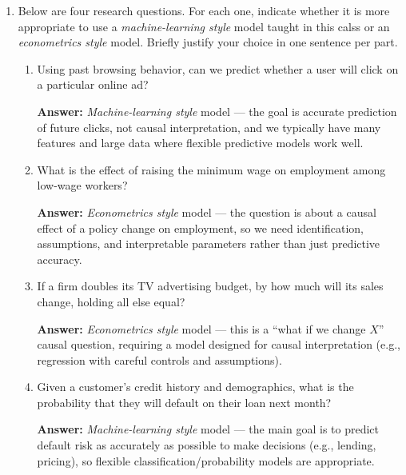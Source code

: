 \documentclass[11pt]{article}
\begin{document}
\begin{enumerate}[leftmargin=*]
\begin{enumerate}
  \textbf{Answer:} Lowering the threshold predicts class 1 for more observations, so we catch almost all the actual positives (higher recall) but also label more negatives as positives (more false positives, so lower precision). This tradeoff—higher recall at the cost of precision—is typical when we make the threshold more lenient.
\end{enumerate} 

\clearpage

\item Below are four research questions. For each one, indicate whether it is more appropriate to use a \emph{machine-learning style} model taught in this calss or an \emph{econometrics style} model. Briefly justify your choice in one sentence per part.

\begin{enumerate}[label=\alph*)]
  \item Using past browsing behavior, can we predict whether a user will click on a particular online ad? 

  \textbf{Answer:} \emph{Machine-learning style} model — the goal is accurate prediction of future clicks, not causal interpretation, and we typically have many features and large data where flexible predictive models work well.

  \item What is the effect of raising the minimum wage on employment among low-wage workers? 

  \textbf{Answer:} \emph{Econometrics style} model — the question is about a causal effect of a policy change on employment, so we need identification, assumptions, and interpretable parameters rather than just predictive accuracy.

  \item If a firm doubles its TV advertising budget, by how much will its sales change, holding all else equal?

  \textbf{Answer:} \emph{Econometrics style} model — this is a “what if we change $X$” causal question, requiring a model designed for causal interpretation (e.g., regression with careful controls and assumptions).

  \item Given a customer’s credit history and demographics, what is the probability that they will default on their loan next month?

  \textbf{Answer:} \emph{Machine-learning style} model — the main goal is to predict default risk as accurately as possible to make decisions (e.g., lending, pricing), so flexible classification/probability models are appropriate.
\end{enumerate}


\end{enumerate}
\end{document}
